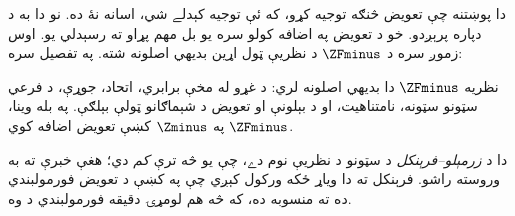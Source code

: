\documentclass[../../../include/open-logic-section]{subfiles}
\begin{document}

دا پوښتنه چې تعويض څنګه توجيه کړو، که ئې توجيه کېدلے شي، اسانه نۀ ده.
نو دا به د  دپاره پرېږدو. خو د تعويض په اضافه
کولو سره يو بل مهم پړاو ته رسېدلي يو. اوس زموږ سره د $\ZFminus$ د
نظريې ټول اړين بديهي اصلونه شته. په تفصيل سره:

\begin{defn}
نظريه $\ZFminus$ دا بديهي اصلونه لري: د غړو له مخې برابري، اتحاد،
جوړې، د فرعي سټونو سټونه، نامتناهيت، او د بېلونې او تعويض د شېماګانو
ټولې بېلګې. په بله وينا، $\ZFminus$ په $\Zminus$ کښې تعويض اضافه کوي.
\end{defn}
\noindent
دا د \emph{زرمېلو--فرېنکل} د سټونو د نظريې نوم دے، چې يو څه ترې
\emph{کم} دي؛ هغې خبرې ته به وروسته راشو. فرېنکل ته دا وياړ ځکه ورکول
کېږي چې په \citeyear{Fraenkel1922} کښې د تعويض فورمولبندي ده ته منسوبه
ده، که څه هم لومړۍ دقيقه فورمولبندي د \citet{Skolem1922} وه.
\end{document}
